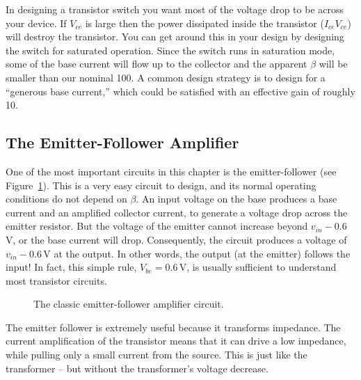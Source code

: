 \documentclass{article}
\begin{document}
In designing a transistor switch you want most of the voltage drop to be across your device. If $V_{ce}$ is large then the power dissipated inside the transistor ($I_{ce} V_{ce}$) will destroy the transistor. You can get around this in your design by designing the switch for saturated operation. Since the switch runs in saturation mode, some of the base current will flow up to the collector and the apparent $\beta$ will be smaller than our nominal 100. A common design strategy is to design for a ``generous base current,'' which could be satisfied with an effective gain of roughly 10. 

\subsection{The Emitter-Follower Amplifier}
One of the most important circuits in this chapter is the emitter-follower (see Figure~\ref{fig:emitter_follower}). This is a very easy circuit to design, and its normal operating conditions do not depend on $\beta$. An input voltage on the base produces a base current and an amplified collector current, to generate a voltage drop across the emitter resistor. But the voltage of the emitter cannot increase beyond $v_{in} - 0.6$\,V, or the base current will drop. Consequently, the circuit produces a voltage of $v_{in} - 0.6$\,V at the output. In other words, the output (at the emitter) follows the input! In fact, this simple rule, $V_{be} = 0.6$\,V, is usually sufficient to understand most transistor circuits.

\begin{figure}
\begin{center}
\end{center}
\caption{The classic emitter-follower amplifier circuit.}
\label{fig:emitter_follower}
\end{figure}

The emitter follower is extremely useful because it transforms impedance. The current amplification of the transistor means that it can drive a low impedance, while pulling only a small current from the source. This is just like the transformer -- but without the transformer's voltage decrease.
\end{document}

